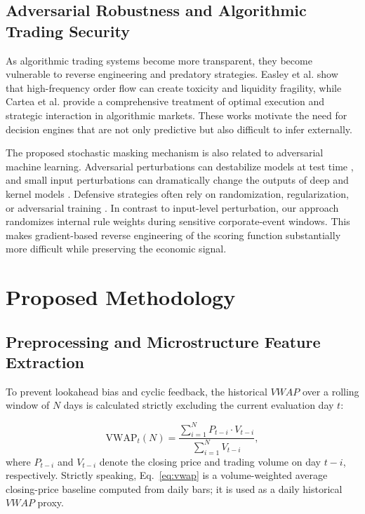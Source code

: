 \documentclass[pdflatex,sn-mathphys-num]{sn-jnl}
\theoremstyle{thmstyleone}
\theoremstyle{thmstyletwo}
\theoremstyle{thmstylethree}
\begin{document}
\subsection{Adversarial Robustness and Algorithmic Trading Security}

As algorithmic trading systems become more transparent, they become vulnerable to reverse engineering and predatory strategies. Easley et al. \cite{easley2012} show that high-frequency order flow can create toxicity and liquidity fragility, while Cartea et al. \cite{cartea2015} provide a comprehensive treatment of optimal execution and strategic interaction in algorithmic markets. These works motivate the need for decision engines that are not only predictive but also difficult to infer externally.

The proposed stochastic masking mechanism is also related to adversarial machine learning. Adversarial perturbations can destabilize models at test time \cite{biggio2013}, and small input perturbations can dramatically change the outputs of deep and kernel models \cite{goodfellow2015}. Defensive strategies often rely on randomization, regularization, or adversarial training \cite{kurakin2017}. In contrast to input-level perturbation, our approach randomizes internal rule weights during sensitive corporate-event windows. This makes gradient-based reverse engineering of the scoring function substantially more difficult while preserving the economic signal.

\section{Proposed Methodology}\label{sec3}

\subsection{Preprocessing and Microstructure Feature Extraction}\label{subsec3_1}

To prevent lookahead bias and cyclic feedback, the historical $VWAP$ over a rolling window of $N$ days is calculated strictly excluding the current evaluation day $t$:

\begin{equation}
    \mathrm{VWAP}_t(N) = \frac{\sum_{i=1}^{N} P_{t-i} \cdot V_{t-i}}{\sum_{i=1}^{N} V_{t-i}},
    \label{eq:vwap}
\end{equation}
where $P_{t-i}$ and $V_{t-i}$ denote the closing price and trading volume on day $t-i$, respectively. Strictly speaking, Eq.~\eqref{eq:vwap} is a volume-weighted average closing-price baseline computed from daily bars; it is used as a daily historical $VWAP$ proxy.
\end{document}
